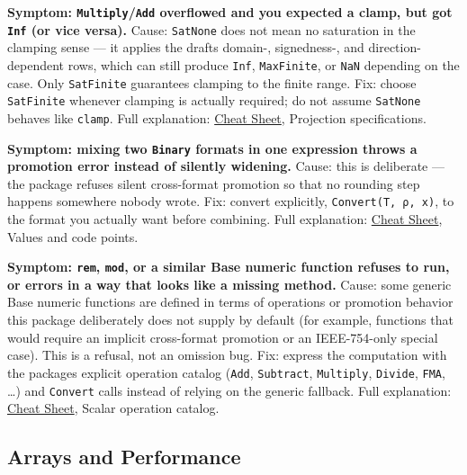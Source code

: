 \label{6618291483251033039}{}


\textbf{Symptom: \texttt{Multiply}/\allowbreak\texttt{Add} overflowed and you expected a clamp, but got \texttt{Inf} (or vice versa).} Cause: \texttt{SatNone} does not mean {\textquotedbl}no saturation{\textquotedbl} in the clamping sense — it applies the draft{\textquotesingle}s domain-, signedness-, and direction-dependent rows, which can still produce \texttt{Inf}, \texttt{MaxFinite}, or \texttt{NaN} depending on the case. Only \texttt{SatFinite} guarantees clamping to the finite range. Fix: choose \texttt{SatFinite} whenever clamping is actually required; do not assume \texttt{SatNone} behaves like \texttt{clamp}. Full explanation: \href{help\_\allowbreak{}cheat\_\allowbreak{}sheet.md}{Cheat Sheet}, Projection specifications.



\textbf{Symptom: mixing two \texttt{Binary} formats in one expression throws a promotion error instead of silently widening.} Cause: this is deliberate — the package refuses silent cross-format promotion so that no rounding step happens somewhere nobody wrote. Fix: convert explicitly, \texttt{Convert(T, ρ, x)}, to the format you actually want before combining. Full explanation: \href{help\_\allowbreak{}cheat\_\allowbreak{}sheet.md}{Cheat Sheet}, Values and code points.



\textbf{Symptom: \texttt{rem}, \texttt{mod}, or a similar Base numeric function refuses to run, or errors in a way that looks like a missing method.} Cause: some generic Base numeric functions are defined in terms of operations or promotion behavior this package deliberately does not supply by default (for example, functions that would require an implicit cross-format promotion or an IEEE-754-only special case). This is a refusal, not an omission bug. Fix: express the computation with the package{\textquotesingle}s explicit operation catalog (\texttt{Add}, \texttt{Subtract}, \texttt{Multiply}, \texttt{Divide}, \texttt{FMA}, …) and \texttt{Convert} calls instead of relying on the generic fallback. Full explanation: \href{help\_\allowbreak{}cheat\_\allowbreak{}sheet.md}{Cheat Sheet}, Scalar operation catalog.



\subsection{Arrays and Performance}



